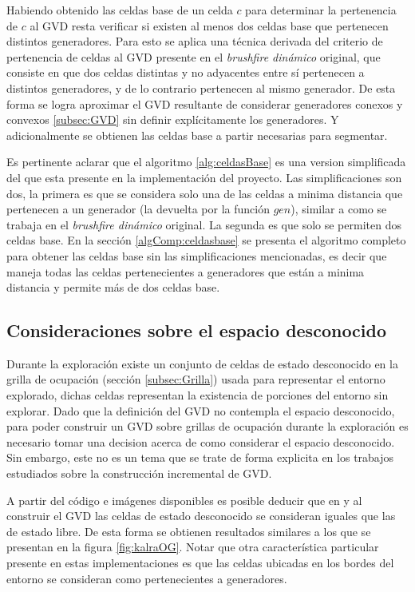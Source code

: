 
Habiendo obtenido las celdas base de un celda $c$ para determinar la
pertenencia de $c$ al GVD resta verificar si existen al menos dos celdas base
que pertenecen distintos generadores. Para esto se aplica una técnica derivada
del criterio de pertenencia de celdas al GVD presente en el \emph{brushfire dinámico}
original, que consiste en que dos celdas distintas y no adyacentes entre
sí pertenecen a distintos generadores, y de lo contrario pertenecen al mismo
generador. De esta forma se logra aproximar el GVD resultante de considerar
generadores conexos y convexos \ref{subsec:GVD} sin definir explícitamente los
generadores. Y adicionalmente se obtienen las celdas base a partir necesarias
para segmentar.

Es pertinente aclarar que el algoritmo \ref{alg:celdasBase} es una version
simplificada del que esta presente en la implementación del proyecto. Las
simplificaciones son dos, la primera es que se considera solo una de las celdas
a minima distancia que pertenecen a un generador (la devuelta por la función
$gen$), similar a como se trabaja en el \emph{brushfire dinámico} original. La
segunda es que solo se permiten dos celdas base. En la sección
\ref{algComp:celdasbase} se presenta el algoritmo completo para obtener las
celdas base sin las simplificaciones mencionadas, es decir que maneja todas las
celdas pertenecientes a generadores que están a minima distancia y permite más
de dos celdas base.

\subsection{Consideraciones sobre el espacio desconocido}\label{subsec:espDesc}

Durante la exploración existe un conjunto de celdas de estado desconocido en la
grilla de ocupación (sección \ref{subsec:Grilla}) usada para representar el
entorno explorado, dichas celdas representan la existencia de porciones del
entorno sin explorar. Dado que la definición del GVD no contempla el espacio
desconocido, para poder construir un GVD sobre grillas de ocupación durante la
exploración es necesario tomar una decision acerca de como considerar el 
espacio desconocido. Sin embargo, este no es un tema que se trate de forma
explicita en los trabajos estudiados sobre la construcción incremental de GVD. 

A partir del código e imágenes disponibles es posible deducir que en
\cite{kalra2009incremental} y \cite{Lau2013} al construir el GVD las celdas de
estado desconocido se consideran iguales que las de estado libre. De esta
forma se obtienen resultados similares a los que se presentan en la figura
\ref{fig:kalraOG}. Notar que otra característica particular presente en estas
implementaciones es que las celdas ubicadas en los bordes del entorno se
consideran como pertenecientes a generadores.

